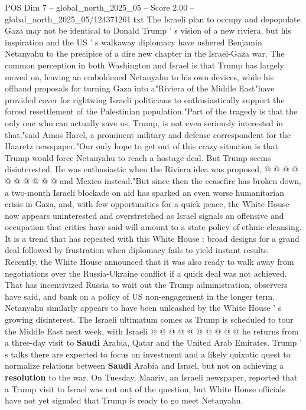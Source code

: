 \begin{textsample}{POS Dim 7 – global\_north\_2025\_05 – Score 2.00 – global\_north\_2025\_05/124371261.txt}  \label{ex:f7_pos_344}
The Israeli plan to occupy and depopulate Gaza may not be identical to Donald Trump ' s vision of a new riviera, but his inspiration and the US ' s walkaway diplomacy have ushered Benjamin Netanyahu to the precipice of a dire new chapter in the Israel-Gaza war.
The common perception in both Washington and Israel is that Trump has largely moved on, leaving an emboldened Netanyahu to his own devices, while his offhand proposals for turning Gaza into a"Riviera of the Middle East"have provided cover for rightwing Israeli politicians to enthusiastically support the forced resettlement of the Palestinian population."Part of the tragedy is that the only one who can actually save us, Trump, is not even seriously interested in that,"said Amos Harel, a prominent military and defense correspondent for the Haaretz newspaper."Our only hope to get out of this crazy situation is that Trump would force Netanyahu to reach a hostage deal.
But Trump seems disinterested.
He was enthusiastic when the Riviera idea was proposed, @ @ @ @ @ @ @ @ @ @ and Mexico instead."But since then the ceasefire has broken down, a two-month Israeli blockade on aid has sparked an even worse humanitarian crisis in Gaza, and, with few opportunities for a quick peace, the White House now appears uninterested and overstretched as Israel signals an offensive and occupation that critics have said will amount to a state policy of ethnic cleansing.
It is a trend that has repeated with this White House : broad designs for a grand deal followed by frustration when diplomacy fails to yield instant results.
Recently, the White House announced that it was also ready to walk away from negotiations over the Russia-Ukraine conflict if a quick deal was not achieved.
That has incentivized Russia to wait out the Trump administration, observers have said, and bank on a policy of US non-engagement in the longer term.
Netanyahu similarly appears to have been unleashed by the White House ' s growing disinterest.
The Israeli ultimatum comes as Trump is scheduled to tour the Middle East next week, with Israeli @ @ @ @ @ @ @ @ @ @ he returns from a three-day visit to \textbf{Saudi} Arabia, Qatar and the United Arab Emirates.
Trump ' s talks there are expected to focus on investment and a likely quixotic quest to normalize relations between \textbf{Saudi} Arabia and Israel, but not on achieving a \textbf{resolution} to the war.
On Tuesday, Maariv, an Israeli newspaper, reported that a Trump visit to Israel was not out of the question, but White House officials have not yet signaled that Trump is ready to go meet Netanyahu.

\end{textsample}
